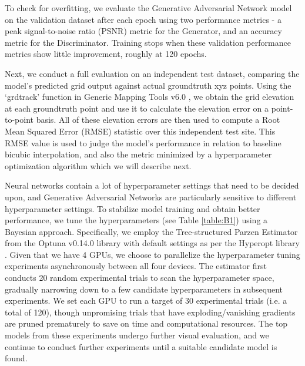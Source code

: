 \documentclass[tc, manuscript]{copernicus}
\begin{document}
To check for overfitting, we evaluate the Generative Adversarial Network model on the validation dataset after each epoch using two performance metrics - a peak signal-to-noise ratio (PSNR) metric for the Generator, and an accuracy metric for the Discriminator.
Training stops when these validation performance metrics show little improvement, roughly at 120 epochs.

Next, we conduct a full evaluation on an independent test dataset, comparing the model's predicted grid output against actual groundtruth xyz points.
Using the `grdtrack' function in Generic Mapping Tools v6.0 \citep{WesselGenericMappingTools2019}, we obtain the grid elevation at each groundtruth point and use it to calculate the elevation error on a point-to-point basis.
All of these elevation errors are then used to compute a Root Mean Squared Error (RMSE) statistic over this independent test site.
This RMSE value is used to judge the model's performance in relation to baseline bicubic interpolation, and also the metric minimized by a hyperparameter optimization algorithm which we will describe next.

Neural networks contain a lot of hyperparameter settings that need to be decided upon, and Generative Adversarial Networks are particularly sensitive to different hyperparameter settings.
To stabilize model training and obtain better performance, we tune the hyperparameters (see Table \ref{table:B1}) using a Bayesian approach.
Specifically, we employ the Tree-structured Parzen Estimator \citep{BergstraAlgorithmsHyperparameterOptimization2011} from the Optuna v0.14.0 \citep{AkibaOptunaNextgenerationHyperparameter2019} library with default settings as per the Hyperopt library \citep{BergstraHyperoptPythonlibrary2015}.
Given that we have 4 GPUs, we choose to parallelize the hyperparameter tuning experiments asynchronously between all four devices.
The estimator first conducts 20 random experimental trials to scan the hyperparameter space, gradually narrowing down to a few candidate hyperparameters in subsequent experiments.
We set each GPU to run a target of 30 experimental trials (i.e. a total of 120), though unpromising trials that have exploding/vanishing gradients are pruned prematurely to save on time and computational resources.
The top models from these experiments undergo further visual evaluation, and we continue to conduct further experiments until a suitable candidate model is found.

\noappendix       %
\end{document}
